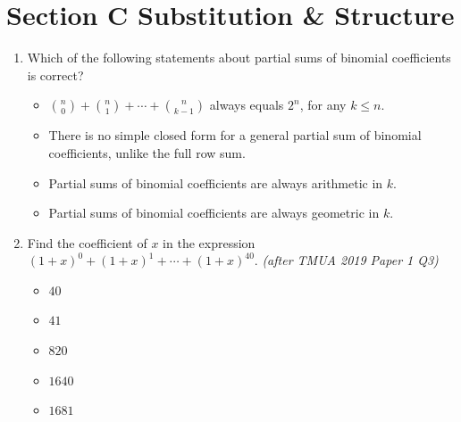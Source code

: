 \documentclass[11pt,a4paper]{article}
\begin{document}
\section*{Section C \quad Substitution \& Structure}
\begin{enumerate}

\item Which of the following statements about partial sums of binomial coefficients is correct?
\begin{itemize}
\item[A)] $\binom n0+\binom n1+\cdots+\binom n{k-1}$ always equals $2^n$, for any $k\leq n$.
\item[B)] There is no simple closed form for a general partial sum of binomial coefficients, unlike the full row sum.
\item[C)] Partial sums of binomial coefficients are always arithmetic in $k$.
\item[D)] Partial sums of binomial coefficients are always geometric in $k$.
\end{itemize}


\item Find the coefficient of $x$ in the expression $(1+x)^0+(1+x)^1+\cdots+(1+x)^{40}$. \textit{\small(after TMUA 2019 Paper 1 Q3)}
\begin{itemize}
\item[A)] $40$
\item[B)] $41$
\item[C)] $820$
\item[D)] $1640$
\item[E)] $1681$
\end{itemize}


\end{enumerate}
\end{document}
